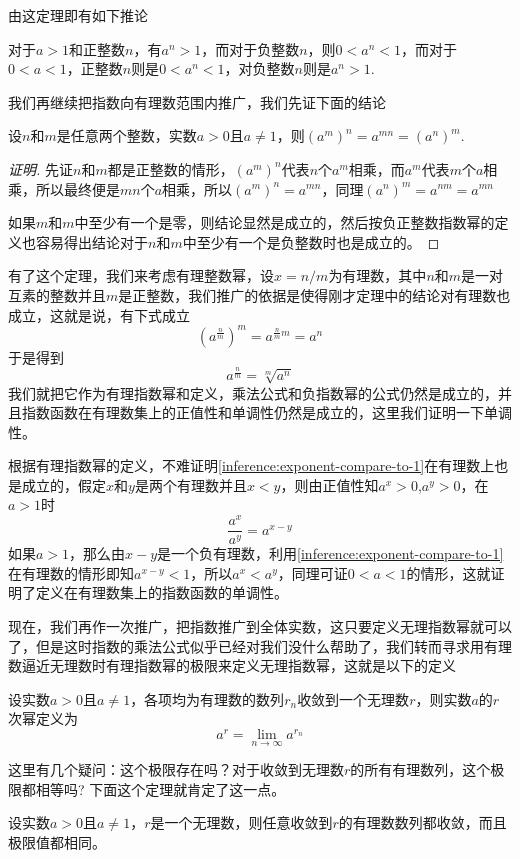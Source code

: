 由这定理即有如下推论
\begin{inference}
  \label{inference:exponent-compare-to-1}
对于$a>1$和正整数$n$，有$a^n>1$，而对于负整数$n$，则$0<a^n<1$，而对于$0<a<1$，正整数$n$则是$0<a^n<1$，对负整数$n$则是$a^n>1$.
\end{inference}


我们再继续把指数向有理数范围内推广，我们先证下面的结论
\begin{theorem}
 设$n$和$m$是任意两个整数，实数$a>0$且$a \neq 1$，则$(a^m)^n = a^{mn} = (a^n)^m$. 
\end{theorem}

\begin{proof}[证明]
  先证$n$和$m$都是正整数的情形，$(a^m)^n$代表$n$个$a^m$相乘，而$a^m$代表$m$个$a$相乘，所以最终便是$mn$个$a$相乘，所以$(a^m)^n=a^{mn}$，同理$(a^n)^m=a^{nm}=a^{mn}$

  如果$m$和$m$中至少有一个是零，则结论显然是成立的，然后按负正整数指数幂的定义也容易得出结论对于$n$和$m$中至少有一个是负整数时也是成立的。
\end{proof}

有了这个定理，我们来考虑有理整数幂，设$x=n/m$为有理数，其中$n$和$m$是一对互素的整数并且$m$是正整数，我们推广的依据是使得刚才定理中的结论对有理数也成立，这就是说，有下式成立
\[ (a^{\frac{n}{m}})^m = a^{\frac{n}{m}m} = a^n \]
于是得到
\[ a^{\frac{n}{m}} = \sqrt[m]{a^n} \]
我们就把它作为有理指数幂和定义，乘法公式和负指数幂的公式仍然是成立的，并且指数函数在有理数集上的正值性和单调性仍然是成立的，这里我们证明一下单调性。

根据有理指数幂的定义，不难证明\autoref{inference:exponent-compare-to-1}在有理数上也是成立的，假定$x$和$y$是两个有理数并且$x<y$，则由正值性知$a^x>0$,$a^y>0$，在$a>1$时
\[ \frac{a^x}{a^y} = a^{x-y} \]
如果$a>1$，那么由$x-y$是一个负有理数，利用\autoref{inference:exponent-compare-to-1} 在有理数的情形即知$a^{x-y}<1$，所以$a^x<a^y$，同理可证$0<a<1$的情形，这就证明了定义在有理数集上的指数函数的单调性。

现在，我们再作一次推广，把指数推广到全体实数，这只要定义无理指数幂就可以了，但是这时指数的乘法公式似乎已经对我们没什么帮助了，我们转而寻求用有理数逼近无理数时有理指数幂的极限来定义无理指数幂，这就是以下的定义
\begin{definition}
  设实数$a>0$且$a \neq 1$，各项均为有理数的数列$r_n$收敛到一个无理数$r$，则实数$a$的$r$次幂定义为
  \[ a^r = \lim_{n \to \infty} a^{r_n} \]
\end{definition}

这里有几个疑问：这个极限存在吗？对于收敛到无理数$r$的所有有理数列，这个极限都相等吗? 下面这个定理就肯定了这一点。
\begin{theorem}
  设实数$a>0$且$a \neq 1$，$r$是一个无理数，则任意收敛到$r$的有理数数列都收敛，而且极限值都相同。
\end{theorem}

